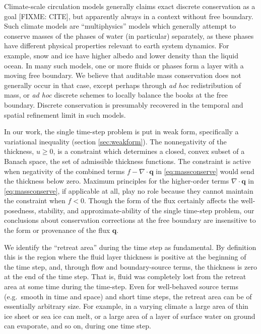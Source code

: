 \documentclass[final,leqno,onefignum,onetabnum]{siamltex1213bueler}
\newcommand\bq{\mathbf{q}}
\newcommand{\Div}{\nabla\cdot}
\begin{document}
Climate-scale circulation models generally claims exact discrete conservation as a goal [FIXME: CITE], but apparently always in a context without free boundary.  Such climate models are ``multiphysics'' models which generally attempt to conserve masses of the phases of water (in particular) separately, as these phases have different physical properties relevant to earth system dynamics.  For example, snow and ice have higher albedo and lower density than the liquid ocean.  In many such models, one or more fluids or phases form a layer with a moving free boundary.  We believe that auditable mass conservation does not generally occur in that case, except perhaps through \emph{ad hoc} redistribution of mass, or \emph{ad hoc} discrete schemes to locally balance the books at the free boundary.  Discrete conservation is presumably recovered in the temporal and spatial refinement limit in such models.

In our work, the single time-step problem is put in weak form, specifically a variational inequality (section \ref{sec:weakform}).  The nonnegativity of the thickness, $u\ge 0$, is a constraint which determines a closed, convex subset of a Banach space, the set of admissible thickness functions.  The constraint is active when negativity of the combined terms $f - \Div \bq$ in \eqref{eq:massconserve} would send the thickness below zero.  Maximum principles for the higher-order terms $\Div\bq$ in \eqref{eq:massconserve}, if applicable at all, play no role because they cannot maintain the constraint when $f<0$.  Though the form of the flux certainly affects the well-posedness, stability, and approximate-ability of the single time-step problem, our conclusions about conservation corrections at the free boundary are insensitive to the form or provenance of the flux $\bq$.

We identify the ``retreat area'' during the time step as fundamental.  By definition this is the region where the fluid layer thickness is positive at the beginning of the time step, and, through flow and boundary-source terms, the thickness is zero at the end of the time step.  That is, fluid was completely lost from the retreat area at some time during the time-step.  Even for well-behaved source terms (e.g.~smooth in time and space) and short time steps, the retreat area can be of essentially arbitrary size.  For example, in a varying climate a large area of thin ice sheet or sea ice can melt, or a large area of a layer of surface water on ground can evaporate, and so on, during one time step.
\end{document}
